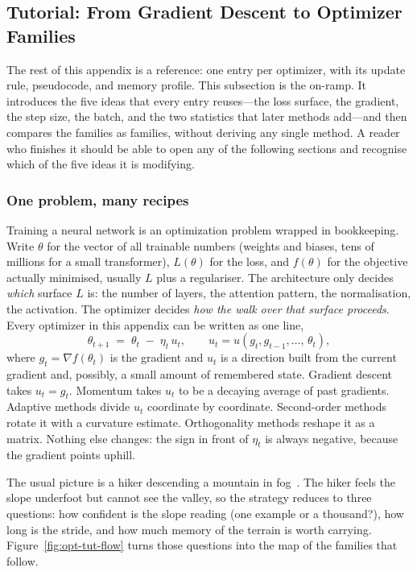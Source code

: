 \subsection{Tutorial: From Gradient Descent to Optimizer Families}
\label{sec:opt-tutorial}

The rest of this appendix is a reference: one entry per optimizer, with its
update rule, pseudocode, and memory profile. This subsection is the on-ramp.
It introduces the five ideas that every entry reuses---the loss surface, the
gradient, the step size, the batch, and the two statistics that later methods
add---and then compares the families as families, without deriving any single
method. A reader who finishes it should be able to open any of the following
sections and recognise which of the five ideas it is modifying.

\subsubsection{One problem, many recipes}
\label{sec:opt-tutorial-problem}

Training a neural network is an optimization problem wrapped in bookkeeping.
Write $\theta$ for the vector of all trainable numbers (weights and biases,
tens of millions for a small transformer), $L(\theta)$ for the loss, and
$f(\theta)$ for the objective actually minimised, usually $L$ plus a
regulariser. The architecture only decides \emph{which} surface $L$ is: the
number of layers, the attention pattern, the normalisation, the activation.
The optimizer decides \emph{how the walk over that surface proceeds}. Every
optimizer in this appendix can be written as one line,
\begin{equation}
\theta_{t+1} \;=\; \theta_t \;-\; \eta_t\, u_t,
\qquad u_t = u\!\left(g_t, g_{t-1}, \dots,\, \theta_t\right),
\label{eq:opt-tut-generic}
\end{equation}
where $g_t=\nabla f(\theta_t)$ is the gradient and $u_t$ is a direction built
from the current gradient and, possibly, a small amount of remembered state.
Gradient descent takes $u_t=g_t$. Momentum takes $u_t$ to be a decaying
average of past gradients. Adaptive methods divide $u_t$ coordinate by
coordinate. Second-order methods rotate it with a curvature estimate.
Orthogonality methods reshape it as a matrix. Nothing else changes: the sign
in front of $\eta_t$ is always negative, because the gradient points uphill.

The usual picture is a hiker descending a mountain in fog~\citep{ibm_sgd_2025}.
The hiker feels the slope underfoot but cannot see the valley, so the strategy
reduces to three questions: how confident is the slope reading (one example or
a thousand?), how long is the stride, and how much memory of the terrain is
worth carrying. Figure~\ref{fig:opt-tut-flow} turns those questions into the
map of the families that follow.

